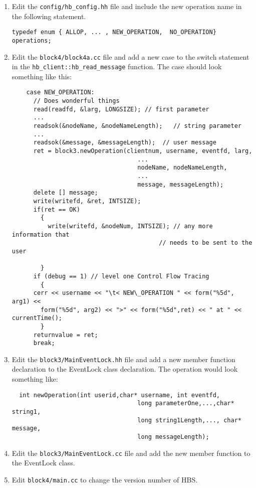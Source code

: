 \begin{enumerate}
\item Edit the {\tt config/hb\_config.hh} file and include the new operation
  name in the following statement.\small 
  \begin{verbatim}typedef enum { ALLOP, ... , NEW_OPERATION,  NO_OPERATION} operations; 
  \end{verbatim} \normalsize 

\item Edit the {\tt block4/block4a.cc} file and add a new case to the
switch statement in the {\tt hb\_client::hb\_read\_message} function.  The
case should look something like this: \small \begin{verbatim}
    case NEW_OPERATION:
      // Does wonderful things
      read(readfd, &larg, LONGSIZE); // first parameter
      ...
      readsok(&nodeName, &nodeNameLength);   // string parameter
      ...
      readsok(&message, &messageLength);  // user message
      ret = block3.newOperation(clientnum, username, eventfd, larg,
                                   ...
                                   nodeName, nodeNameLength,
                                   ...
                                   message, messageLength);
      delete [] message;
      write(writefd, &ret, INTSIZE);
      if(ret == OK)
        {
          write(writefd, &nodeNum, INTSIZE); // any more information that
	                                     // needs to be sent to the user

        }	  
      if (debug == 1) // level one Control Flow Tracing 
        { 
	  cerr << username << "\t< NEW\_OPERATION " << form("%5d", arg1) << 
	    form("%5d", arg2) << ">" << form("%5d",ret) << " at " << currentTime(); 
        }  
      returnvalue = ret;      
      break;
\end{verbatim}
\normalsize

\item Edit the {\tt block3/MainEventLock.hh} file and add a new member
  function declaration to the EventLock class declaration.  The operation
  would look something like: \small
\begin{verbatim}  int newOperation(int userid,char* username, int eventfd,
                                   long parameterOne,...,char* string1, 
                                   long string1Length,..., char* message,
                                   long messageLength);
\end{verbatim}
\normalsize

\item Edit the {\tt block3/MainEventLock.cc} file and add the new member
function to the EventLock class.

\item Edit {\tt block4/main.cc} to change the version number of HBS.

\end{enumerate}

